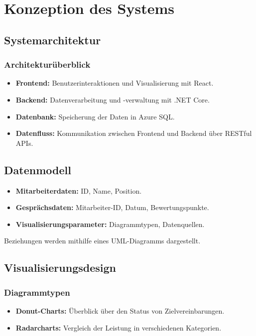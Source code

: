 \chapter{Konzeption des Systems}
\label{chap:konzeption}

\section{Systemarchitektur}
\subsection{Architekturüberblick}
\begin{itemize}
    \item \textbf{Frontend:} Benutzerinteraktionen und Visualisierung mit React.
    \item \textbf{Backend:} Datenverarbeitung und -verwaltung mit .NET Core.
    \item \textbf{Datenbank:} Speicherung der Daten in Azure SQL.
    \item \textbf{Datenfluss:} Kommunikation zwischen Frontend und Backend über RESTful APIs.
\end{itemize}

\section{Datenmodell}
\begin{itemize}
    \item \textbf{Mitarbeiterdaten:} ID, Name, Position.
    \item \textbf{Gesprächsdaten:} Mitarbeiter-ID, Datum, Bewertungspunkte.
    \item \textbf{Visualisierungsparameter:} Diagrammtypen, Datenquellen.
\end{itemize}
Beziehungen werden mithilfe eines UML-Diagramms dargestellt.

\section{Visualisierungsdesign}
\subsection{Diagrammtypen}
\begin{itemize}
    \item \textbf{Donut-Charts:} Überblick über den Status von Zielvereinbarungen.
    \item \textbf{Radarcharts:} Vergleich der Leistung in verschiedenen Kategorien.
\end{itemize}

